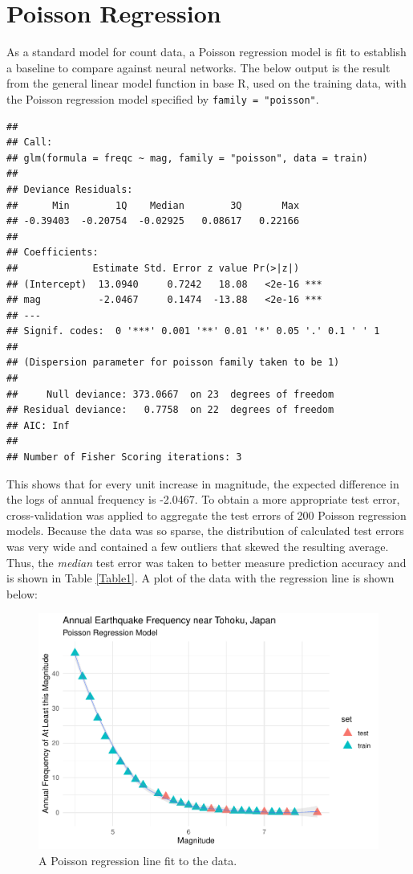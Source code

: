 
\section{Poisson Regression}
As a standard model for count data, a Poisson regression model is fit to establish a baseline to compare against neural networks. The below output is the result from the general linear model function in base R, used on the training data, with the Poisson regression model specified by \texttt{family = "poisson"}.

\begin{verbatim}
## 
## Call:
## glm(formula = freqc ~ mag, family = "poisson", data = train)
## 
## Deviance Residuals: 
##      Min        1Q    Median        3Q       Max  
## -0.39403  -0.20754  -0.02925   0.08617   0.22166  
## 
## Coefficients:
##             Estimate Std. Error z value Pr(>|z|)    
## (Intercept)  13.0940     0.7242   18.08   <2e-16 ***
## mag          -2.0467     0.1474  -13.88   <2e-16 ***
## ---
## Signif. codes:  0 '***' 0.001 '**' 0.01 '*' 0.05 '.' 0.1 ' ' 1
## 
## (Dispersion parameter for poisson family taken to be 1)
## 
##     Null deviance: 373.0667  on 23  degrees of freedom
## Residual deviance:   0.7758  on 22  degrees of freedom
## AIC: Inf
## 
## Number of Fisher Scoring iterations: 3
\end{verbatim}

This shows that for every unit increase in magnitude, the expected difference in the logs of annual frequency is -2.0467.  To obtain a more appropriate test error, cross-validation was applied to aggregate the test errors of 200 Poisson regression models. Because the data was so sparse, the distribution of calculated test errors was very wide and contained a few outliers that skewed the resulting average.  Thus, the \textit{median} test error was taken to better measure prediction accuracy and is shown in Table \ref{Table1}.  A plot of the data with the regression line is shown below:


\begin{figure}[H]
    \center
    \includegraphics[width=0.75\linewidth]{Appendix_eq_files/figure-latex/unnamed-chunk-3-1.pdf}
    \caption{\footnotesize{A Poisson regression line fit to the data.}}
    \label{tohoku_unfit}
\end{figure}

